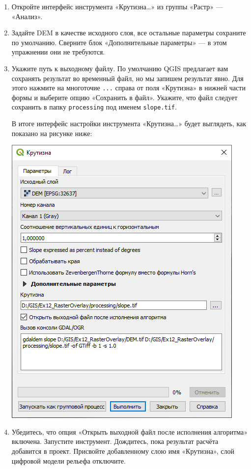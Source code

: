 \documentclass[
  12pt,
]{book}
\begin{document}
\begin{enumerate}
\def\labelenumi{\arabic{enumi}.}
\setcounter{enumi}{2}
\item
  Откройте интерфейс инструмента «Крутизна\ldots» из группы «Растр» --- «Анализ».
\item
  Задайте DEM в качестве исходного слоя, все остальные параметры сохраните по умолчанию. Сверните блок «Дополнительные параметры» --- в этом упражнении они не требуются.
\item
  Укажите путь к выходному файлу. По умолчанию QGIS предлагает вам сохранять результат во временный файл, но мы запишем результат явно. Для этого нажмите на многоточие \texttt{...} справа от поля «Крутизна» в нижней части формы и выберите опцию «Сохранить в файл». Укажите, что файл следует сохранить в папку \texttt{processing} под именем \texttt{slope.tif}.

  В итоге интерфейс настройки инструмента «Крутизна\ldots» будет выглядеть, как показано на рисунке ниже:

  \includegraphics{images/Ex12/slope_settings.png}
\item
  Убедитесь, что опция «Открыть выходной файл после исполнения алгоритма» включена. Запустите инструмент. Дождитесь, пока результат расчёта добавится в проект. Присвойте добавленному слою имя «Крутизна», слой цифровой модели рельефа отключите.


\end{enumerate}
\end{document}

